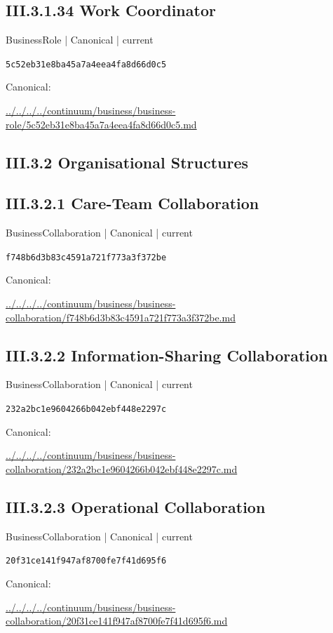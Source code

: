 \documentclass[10pt,a4paper]{article}
\begin{document}
\subsection*{III.3.1.34 Work Coordinator}
\label{element-5c52eb31e8ba45a7a4eea4fa8d66d0c5}
{\small BusinessRole | Canonical | current}\par
\texttt{5c52eb31e8ba45a7a4eea4fa8d66d0c5}\par
Canonical: \par
{\footnotesize\url{../../../../continuum/business/business-role/5c52eb31e8ba45a7a4eea4fa8d66d0c5.md}}\par
\subsection*{III.3.2 Organisational Structures}
\subsection*{III.3.2.1 Care-Team Collaboration}
\label{element-f748b6d3b83c4591a721f773a3f372be}
{\small BusinessCollaboration | Canonical | current}\par
\texttt{f748b6d3b83c4591a721f773a3f372be}\par
Canonical: \par
{\footnotesize\url{../../../../continuum/business/business-collaboration/f748b6d3b83c4591a721f773a3f372be.md}}\par
\subsection*{III.3.2.2 Information-Sharing Collaboration}
\label{element-232a2bc1e9604266b042ebf448e2297c}
{\small BusinessCollaboration | Canonical | current}\par
\texttt{232a2bc1e9604266b042ebf448e2297c}\par
Canonical: \par
{\footnotesize\url{../../../../continuum/business/business-collaboration/232a2bc1e9604266b042ebf448e2297c.md}}\par
\subsection*{III.3.2.3 Operational Collaboration}
\label{element-20f31ce141f947af8700fe7f41d695f6}
{\small BusinessCollaboration | Canonical | current}\par
\texttt{20f31ce141f947af8700fe7f41d695f6}\par
Canonical: \par
{\footnotesize\url{../../../../continuum/business/business-collaboration/20f31ce141f947af8700fe7f41d695f6.md}}\par
\end{document}
